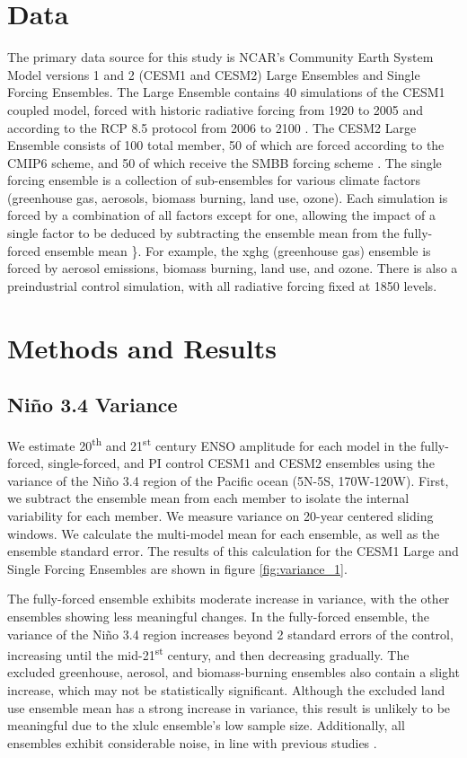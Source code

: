 \documentclass[11pt]{article}
\begin{document}
\section{Data}
\label{sec:org80af315}

The primary data source for this study is NCAR's Community Earth System Model versions 1 and 2 (CESM1 and CESM2) Large Ensembles and Single Forcing Ensembles. The Large Ensemble contains 40 simulations of the CESM1 coupled model, forced with historic radiative forcing from 1920 to 2005 and according to the RCP 8.5 protocol from 2006 to 2100 \citep{kay2015community}. The CESM2 Large Ensemble consists of 100 total member, 50 of which are forced according to the CMIP6 scheme, and 50 of which receive the SMBB forcing scheme \citep{danabasoglu2020community}. The single forcing ensemble is a collection of sub-ensembles for various climate factors (greenhouse gas, aerosols, biomass burning, land use, ozone). Each simulation is forced by a combination of all factors except for one, allowing the impact of a single factor to be deduced by subtracting the ensemble mean from the fully-forced ensemble mean \citep{deser2020isolating}\}. For example, the xghg (greenhouse gas) ensemble is forced by aerosol emissions, biomass burning, land use, and ozone. There is also a preindustrial control simulation, with all radiative forcing fixed at 1850 levels.

\section{Methods and Results}
\label{sec:org99aa203}

\subsection{Niño 3.4 Variance}
\label{sec:org6cadc23}
We estimate 20\textsuperscript{th} and 21\textsuperscript{st} century ENSO amplitude for each model in the fully-forced, single-forced, and PI control CESM1 and CESM2 ensembles using the variance of the Niño 3.4 region of the Pacific ocean (5N-5S, 170W-120W). First, we subtract the ensemble mean from each member to isolate the internal variability for each member. We measure variance on 20-year centered sliding windows. We calculate the multi-model mean for each ensemble, as well as the ensemble standard error. The results of this calculation  for the CESM1 Large and Single Forcing Ensembles are shown in figure \ref{fig:variance_1}.

The fully-forced ensemble exhibits moderate increase in variance, with the other ensembles showing less meaningful changes. In the fully-forced ensemble, the variance of the Niño 3.4 region increases beyond 2 standard errors of the control, increasing until the mid-21\textsuperscript{st} century, and then decreasing gradually. The excluded greenhouse, aerosol, and biomass-burning ensembles also contain a slight increase, which may not be statistically significant. Although the excluded land use ensemble mean has a strong increase in variance, this result is unlikely to be meaningful due to the xlulc ensemble's low sample size. Additionally, all ensembles exhibit considerable noise, in line with previous studies \citep{maher2018enso}.
\end{document}
